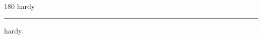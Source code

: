 
\begin{frame}
\begin{center}
\begin{turn}{180}
{\fontsize{2.5cm}{1em}\selectfont hardy}
\end{turn}
\vspace{1em}\par  
\hrule
\vspace{1em}\par  
{\fontsize{2.5cm}{1em}\selectfont hardy}
\end{center}
\end{frame}
